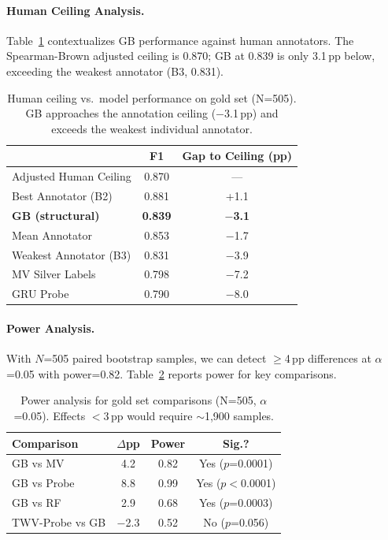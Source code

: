 \documentclass[11pt,a4paper]{article}
\begin{document}
\paragraph{Human Ceiling Analysis.}
Table~\ref{tab:human_ceiling} contextualizes GB performance against human annotators.
The Spearman-Brown adjusted ceiling is 0.870; GB at 0.839 is only 3.1\,pp below, exceeding the weakest annotator (B3, 0.831).

\begin{table}[t]
\centering
\small
\begin{tabular}{lcc}
\toprule
 & \textbf{F1} & \textbf{Gap to Ceiling (pp)} \\
\midrule
Adjusted Human Ceiling & 0.870 & --- \\
Best Annotator (B2) & 0.881 & +1.1 \\
\textbf{GB (structural)} & \textbf{0.839} & \textbf{$-$3.1} \\
Mean Annotator & 0.853 & $-$1.7 \\
Weakest Annotator (B3) & 0.831 & $-$3.9 \\
MV Silver Labels & 0.798 & $-$7.2 \\
GRU Probe & 0.790 & $-$8.0 \\
\bottomrule
\end{tabular}
\caption{Human ceiling vs.\ model performance on gold set (N=505). GB approaches the annotation ceiling ($-$3.1\,pp) and exceeds the weakest individual annotator.}
\label{tab:human_ceiling}
\end{table}

\paragraph{Power Analysis.}
With $N$=505 paired bootstrap samples, we can detect $\geq$4\,pp differences at $\alpha$=0.05 with power=0.82.
Table~\ref{tab:power} reports power for key comparisons.

\begin{table}[t]
\centering
\small
\begin{tabular}{lccc}
\toprule
\textbf{Comparison} & \textbf{$\Delta$pp} & \textbf{Power} & \textbf{Sig.?} \\
\midrule
GB vs MV & 4.2 & 0.82 & Yes ($p$=0.0001) \\
GB vs Probe & 8.8 & 0.99 & Yes ($p<$0.0001) \\
GB vs RF & 2.9 & 0.68 & Yes ($p$=0.0003) \\
TWV-Probe vs GB & $-$2.3 & 0.52 & No ($p$=0.056) \\
\bottomrule
\end{tabular}
\caption{Power analysis for gold set comparisons (N=505, $\alpha$=0.05). Effects $<$3\,pp would require $\sim$1{,}900 samples.}
\label{tab:power}
\end{table}
\end{document}
